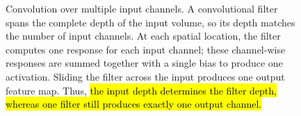 \begin{figure}[!htp]

    \caption{Convolution over multiple input channels. A convolutional filter spans the complete depth of the input volume, so its depth matches the number of input channels. At each spatial location, the filter computes one response for each input channel; these channel-wise responses are summed together with a single bias to produce one activation. Sliding the filter across the input produces one output feature map. Thus, \hl{the input depth determines the filter depth, whereas one filter still produces exactly one output channel.}}
    \label{fig:multiple-input-channels}
\end{figure}